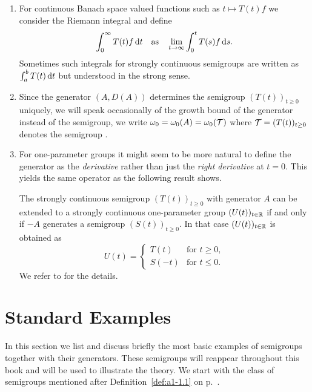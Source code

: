 \begin{remarks}\label{rem:a1-1.12}
\begin{enumerate}[\upshape(i), wide, labelindent=.5em]
\item 
For continuous Banach space valued functions such as $t \mapsto T(t)f$ we consider the Riemann integral and define 
\[
	\int_{0}^{\infty}T(t)f  \mathop{}\!\mathrm{d}{t} 
		\quad \text{as} \quad
	\lim_{t \to \infty}\int_{0}^{t}T(s)f  \mathop{}\!\mathrm{d}{s} .
\]
Sometimes such integrals for strongly continuous semigroups are written as $\int_{a}^{b}T(t) \mathop{}\!\mathrm{d}{t}$ but understood in the strong sense.

\item 
Since the generator $(A,D(A))$ determines the semigroup $(T(t))_{t \geq 0}$ uniquely, we will speak occasionally of the growth bound of the generator instead of the semigroup, \ie we write $\omega_{0} = \omega_{0}(A) = \omega_{0}(\mathcal{T})$ where $\mathcal{T} = (T(t))_{t \geq 0}$ denotes the semigroup .

\item 
For one-parameter groups it might seem to be more natural to define the generator as the \emph{derivative} rather than just the \emph{right derivative} at $t = 0$.
This yields the same operator as the following result shows.

The strongly continuous semigroup $(T(t))_{t \geq 0}$ with generator $A$ can be extended to a strongly continuous one-parameter group $(U(t))_{t \in \mathbb{R}}$ if and only if $-A$ generates a semigroup $(S(t))_{t \geq 0}$.
In that case $(U(t))_{t \in \mathbb{R}}$ is obtained as
\[
    U(t) = \begin{cases}
        T(t) & \text{for } t \geq 0 ,\\
        S(-t) & \text{for } t \leq 0 .
    \end{cases}
\]
We refer to \citet[Proposition~1.14]{davies:1980} for the details.

\end{enumerate}
\end{remarks}
\section{Standard Examples}\label{sec:a1-2}
In this section we list and discuss briefly the most basic examples of semigroups together with their generators.
These semigroups will reappear throughout this book and will be used to illustrate the theory.
We start with the class of semigroups mentioned after Definition~\ref{def:a1-1.1} on p.~\pageref{def:a1-1.1}.
